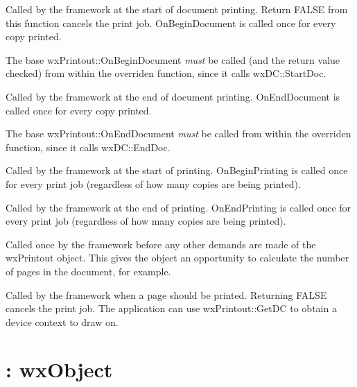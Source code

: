 

Called by the framework at the start of document printing. Return FALSE from
this function cancels the print job. OnBeginDocument is called once for every
copy printed.

The base wxPrintout::OnBeginDocument {\it must} be called (and the return value
checked) from within the overriden function, since it calls wxDC::StartDoc.



Called by the framework at the end of document printing. OnEndDocument
is called once for every copy printed.

The base wxPrintout::OnEndDocument {\it must} be called
from within the overriden function, since it calls wxDC::EndDoc.



Called by the framework at the start of printing. OnBeginPrinting is called once for every
print job (regardless of how many copies are being printed).



Called by the framework at the end of printing. OnEndPrinting
is called once for every print job (regardless of how many copies are being printed).



Called once by the framework before any other demands are made of the
wxPrintout object. This gives the object an opportunity to calculate the
number of pages in the document, for example.



Called by the framework when a page should be printed. Returning FALSE cancels
the print job. The application can use wxPrintout::GetDC to obtain a device
context to draw on.

\section{: wxObject}\label{wxprintpreview}

